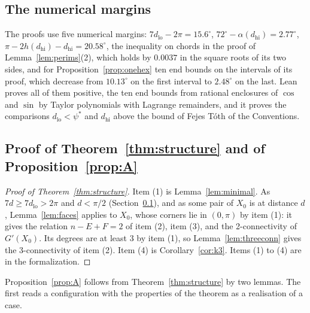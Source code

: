 \documentclass[12pt]{amsart}
\theoremstyle{definition}
\theoremstyle{plain}
\theoremstyle{definition}
\newcommand{\psis}{\psi^{*}}
\newcommand{\dlo}{d_{\mathrm{lo}}}
\newcommand{\dhi}{d_{\mathrm{hi}}}
\newcommand{\leanmap}[1]{\ignorespaces}
\newcommand{\codemap}[1]{\ignorespaces}
\newcommand{\mapnote}[1]{\ignorespaces}
\begin{document}
\subsection{The numerical margins}\label{sec:constants}\leanmap{Tammes15.two_pi_lt_seven_dlo, Tammes15.alpha_dhi_lt, Tammes15.margin_perims, Tammes15.margin_onehex_poly, Tammes15.dlo_lt_arccos_root, Tammes15.Params.arccos_root_lt, Tammes15.Params.fejesToth_value_lt_dhi, Tammes15.onehex_chord_margin}\mapnote{the ten end bounds as $6d<P_{10}(d,h(d))$ for every $d\in[d_{lo},d_{hi}]$}\codemap{code/gp/paper_checks.gp > code/gp/paper_checks.out, code/lean/numerics/onehex_poly.gp > code/lean/numerics/onehex_poly.out, code/lean/numerics/chord.gp > code/lean/numerics/chord.out}
The proofs use five numerical margins: $7\dlo-2\pi=15.6^\circ$, $72^\circ-\alpha(\dhi)=2.77^\circ$, $\pi-2h(\dhi)-\dhi=20.58^\circ$, the inequality on chords in the proof of Lemma~\ref{lem:perims}(2), which holds by $0.0037$ in the square roots of its two sides, and for Proposition~\ref{prop:onehex} ten end bounds on the intervals of its proof, which decrease from $10.13^\circ$ on the first interval to $2.48^\circ$ on the last. Lean proves all of them positive, the ten end bounds from rational enclosures of $\cos$ and $\sin$ by Taylor polynomials with Lagrange remainders, and it proves the comparisons $\dlo<\psis$ and $\dhi$ above the bound of Fejes T\'oth of the Conventions.

\subsection{Proof of Theorem~\ref{thm:structure} and of Proposition~\ref{prop:A}}

\begin{proof}[Proof of Theorem~\ref{thm:structure}]
Item (1) is Lemma~\ref{lem:minimal}. As $7d\ge7\dlo>2\pi$ and $d<\pi/2$ (Section~\ref{sec:constants}), and as some pair of $X_0$ is at distance $d$, Lemma~\ref{lem:faces} applies to $X_0$, whose corners lie in $(0,\pi)$ by item (1): it gives the relation $n-E+F=2$ of item (2), item (3), and the 2-connectivity of $G'(X_0)$. Its degrees are at least $3$ by item (1), so Lemma~\ref{lem:threeconn} gives the 3-connectivity of item (2). Item (4) is Corollary~\ref{cor:k3}. Items (1) to (4) are  in the formalization.
\end{proof}

Proposition~\ref{prop:A} follows from Theorem~\ref{thm:structure} by two lemmas. The first reads a configuration with the properties of the theorem as a realisation of a case.
\end{document}
